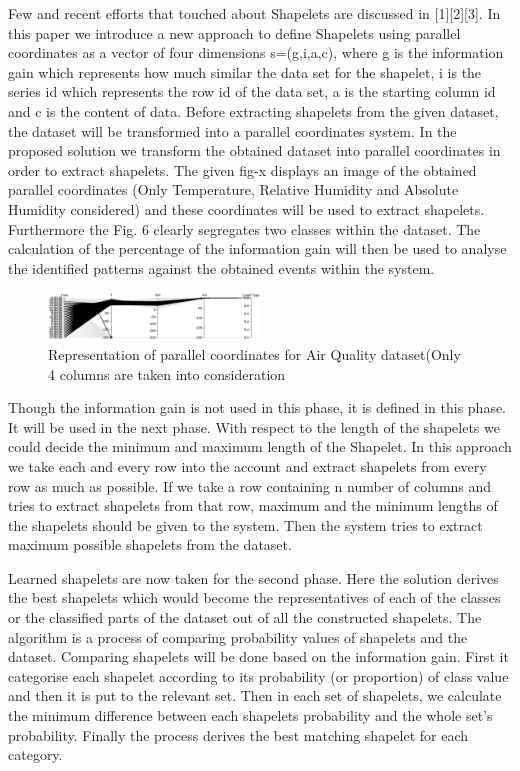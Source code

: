 \documentclass[letterpaper, 10 pt, conference]{IEEEtran}  %
\begin{document}
Few and recent efforts that touched about Shapelets are discussed in [1][2][3]. In this paper we introduce a new approach to define Shapelets using parallel coordinates as a vector of four dimensions s=(g,i,a,c), where g is the information gain which represents how much similar the data set for the shapelet, i is the series id which represents the row id of the data set, a is the starting column id and c is the content of data. Before extracting shapelets from the given dataset, the dataset will be transformed into a parallel coordinates system. In the proposed solution we transform the obtained dataset into  parallel coordinates in order to extract shapelets. The given fig-x displays an image of the obtained parallel coordinates (Only Temperature, Relative Humidity and Absolute Humidity considered) and these coordinates will be used to extract shapelets. Furthermore the Fig. 6 clearly segregates two classes within the dataset. The calculation of the percentage of the information gain will then be used to analyse the identified patterns against the obtained events within the system.
\begin{figure}[h!]
\includegraphics[width=0.5\textwidth]{airQuality.png}
\caption{Representation of parallel coordinates for Air Quality dataset(Only 4 columns are taken into consideration}
\end{figure}

Though the information gain is not used in this phase, it is defined in this phase. It will be used in the next phase. With respect to the length of the shapelets we could decide the minimum and maximum length of the Shapelet.  In this approach we take each and every row into the account and extract shapelets from every row as much as possible. If we take a row containing n number of columns and tries to extract shapelets from that row, maximum and the minimum lengths of the shapelets should be given to the system. Then the system tries to extract maximum possible shapelets from the dataset.

Learned shapelets are now taken for the second phase. Here the solution derives the best shapelets which would become the representatives of each of the classes or the classified parts of the dataset out of all the constructed shapelets. The algorithm is a process of comparing probability values of shapelets and the dataset. Comparing shapelets will be done based on the information gain. First it categorise each shapelet according to its probability (or proportion) of class value and then it is put to the relevant set. Then in each  set of shapelets, we calculate the minimum difference between each shapelets probability and the whole set’s probability. Finally the process derives the best matching shapelet for each category.
\end{document}
